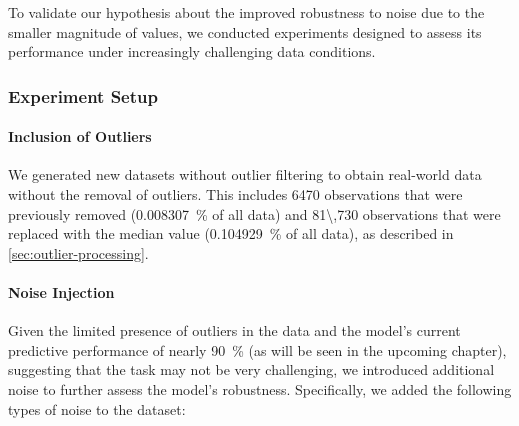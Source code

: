 To validate our hypothesis about the improved robustness to noise due to the smaller magnitude of values, we conducted experiments designed to assess its performance under increasingly challenging data conditions.

\subsubsection*{Experiment Setup}

\paragraph{Inclusion of Outliers}

We generated new datasets without outlier filtering to obtain real-world data without the removal of outliers. This includes \num{6470} observations that were previously removed (\qty{0.008307}{\percent} of all data) and \num{81\,730} observations that were replaced with the median value (\qty{0.104929}{\percent} of all data), as described in \cref{sec:outlier-processing}.

\paragraph{Noise Injection}

Given the limited presence of outliers in the data and the model's current predictive performance of nearly \qty{90}{\percent} (as will be seen in the upcoming chapter), suggesting that the task may not be very challenging, we introduced additional noise to further assess the model's robustness. Specifically, we added the following types of noise to the dataset:


